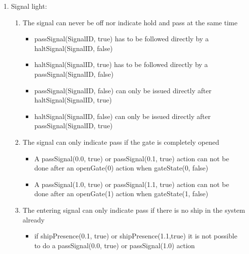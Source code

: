\begin{enumerate}
	\item Signal light:
	\begin{enumerate}
		\item The signal can never be off nor indicate hold and pass at the same time
		\begin{itemize}
			\item passSignal(SignalID, true) has to be followed directly by a haltSignal(SignalID, false)
			\item haltSignal(SignalID, true) has to be followed directly by a passSignal(SignalID, false)
			\item passSignal(SignalID, false) can only be issued directly after haltSignal(SignalID, true)
			\item haltSignal(SignalID, false) can only be issued directly after passSignal(SignalID, true)
		\end{itemize}
		\item The signal can only indicate pass if the gate is completely opened
		\begin{itemize}
			\item A passSignal(0.0, true) or passSignal(0.1, true) action can not be done after an openGate(0) action when gateState(0, false)
			\item A passSignal(1.0, true) or passSignal(1.1, true) action can not be done after an openGate(1) action when gateState(1, false)
		\end{itemize}
		\item The entering signal can only indicate pass if there is no ship in the system already
		\begin{itemize}
			\item if shipPresence(0.1, true) or shipPresence(1.1,true) it is not possible to do a passSignal(0.0, true) or passSignal(1.0) action 
		\end{itemize}
	\end{enumerate}
\end{enumerate}

